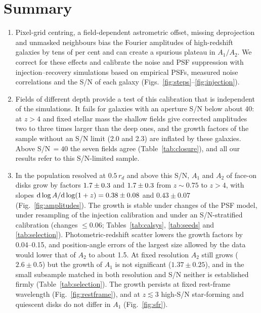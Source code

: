 \documentclass[fleqn,usenatbib]{mnras}
\begin{document}
\section{Summary}\label{sec:summary}

\begin{enumerate}

\item Pixel-grid centring, a field-dependent astrometric offset, missing
deprojection and unmasked neighbours bias the Fourier amplitudes of high-redshift
galaxies by tens of per cent and can create a spurious plateau in $A_1/A_2$. We
correct for these effects and calibrate the noise and PSF suppression with
injection--recovery simulations based on empirical PSFs, measured noise
correlations and the S/N of each galaxy
(Figs.~\ref{fig:steps}--\ref{fig:injection}).

\item Fields of different depth provide a test of this calibration that is
independent of the simulations. It fails for galaxies with an aperture S/N below
about 40: at $z>4$ and fixed stellar mass the shallow fields give corrected
amplitudes two to three times larger than the deep ones, and the growth factors
of the sample without an S/N limit (2.0 and 2.3) are inflated by these galaxies.
Above S/N$\,=40$ the seven fields agree (Table~\ref{tab:closure}), and all our
results refer to this S/N-limited sample.

\item In the population resolved at $0.5\,r_d$ and above this S/N, $A_1$ and
$A_2$ of face-on disks grow by factors $1.7\pm0.3$ and
$1.7\pm0.3$ from $z\sim0.75$ to $z>4$, with slopes
${\rm d}\log A/{\rm d}\log(1+z)=0.38\pm0.08$ and $0.43\pm0.07$
(Fig.~\ref{fig:amplitudes}). The growth is stable under changes of the PSF model,
under resampling of the injection calibration and under an S/N-stratified
calibration (changes $\leq0.06$; Tables~\ref{tab:calsys}, \ref{tab:seeds} and
\ref{tab:selection}). Photometric-redshift scatter lowers the growth factors by
0.04--0.15, and position-angle errors of the largest size allowed by the data
would lower that of $A_2$ to about 1.5. At fixed resolution $A_2$ still grows
($2.6\pm0.5$) but the growth of $A_1$ is not significant ($1.37\pm0.25$), and in
the small subsample matched in both resolution and S/N neither is established
firmly (Table~\ref{tab:selection}). The growth persists at fixed rest-frame
wavelength (Fig.~\ref{fig:restframe}), and at $z\lesssim3$ high-S/N star-forming
and quiescent disks do not differ in $A_1$ (Fig.~\ref{fig:sfr}).


\end{enumerate}
\end{document}
